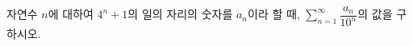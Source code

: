 자연수 $n$에 대하여 $4^n+1$의 일의 자리의 숫자를 $a_n$이라 할 때, $\displaystyle\sum_{n=1}^{\infty}\dfrac{a_n}{10^n}$의 값을 구하시오.
